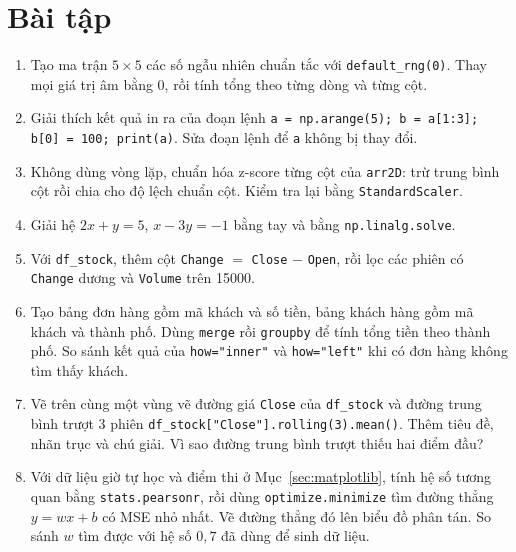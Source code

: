 \section{Bài tập}
\begin{enumerate}
    \item Tạo ma trận $5 \times 5$ các số ngẫu nhiên chuẩn tắc với \texttt{default\_rng(0)}. Thay mọi giá trị âm bằng 0, rồi tính tổng theo từng dòng và từng cột.
    \item Giải thích kết quả in ra của đoạn lệnh \texttt{a = np.arange(5); b = a[1:3]; b[0] = 100; print(a)}. Sửa đoạn lệnh để \texttt{a} không bị thay đổi.
    \item Không dùng vòng lặp, chuẩn hóa z-score từng cột của \texttt{arr2D}: trừ trung bình cột rồi chia cho độ lệch chuẩn cột. Kiểm tra lại bằng \texttt{StandardScaler}.
    \item Giải hệ $2x + y = 5$, $x - 3y = -1$ bằng tay và bằng \texttt{np.linalg.solve}.
    \item Với \texttt{df\_stock}, thêm cột \texttt{Change} $=$ \texttt{Close} $-$ \texttt{Open}, rồi lọc các phiên có \texttt{Change} dương và \texttt{Volume} trên 15000.
    \item Tạo bảng đơn hàng gồm mã khách và số tiền, bảng khách hàng gồm mã khách và thành phố. Dùng \texttt{merge} rồi \texttt{groupby} để tính tổng tiền theo thành phố. So sánh kết quả của \texttt{how="inner"} và \texttt{how="left"} khi có đơn hàng không tìm thấy khách.
    \item Vẽ trên cùng một vùng vẽ đường giá \texttt{Close} của \texttt{df\_stock} và đường trung bình trượt 3 phiên \texttt{df\_stock["Close"].rolling(3).mean()}. Thêm tiêu đề, nhãn trục và chú giải. Vì sao đường trung bình trượt thiếu hai điểm đầu?
    \item Với dữ liệu giờ tự học và điểm thi ở Mục~\ref{sec:matplotlib}, tính hệ số tương quan bằng \texttt{stats.pearsonr}, rồi dùng \texttt{optimize.minimize} tìm đường thẳng $y = wx + b$ có MSE nhỏ nhất. Vẽ đường thẳng đó lên biểu đồ phân tán. So sánh $w$ tìm được với hệ số $0{,}7$ đã dùng để sinh dữ liệu.
\end{enumerate}

